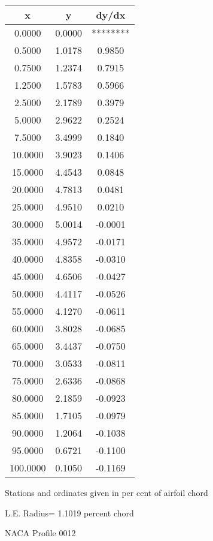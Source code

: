 \documentclass[11pt]{book}
\begin{document}
 \vspace{8mm}
 \begin{tabular}{|c|c|c|} \hline 
  x  &  y  &  dy/dx \\
 \hline
0.0000 & 0.0000 & ******** \\
0.5000 & 1.0178 & 0.9850 \\
0.7500 & 1.2374 & 0.7915 \\
1.2500 & 1.5783 & 0.5966 \\
2.5000 & 2.1789 & 0.3979 \\
5.0000 & 2.9622 & 0.2524 \\
7.5000 & 3.4999 & 0.1840 \\
10.0000 & 3.9023 & 0.1406 \\
15.0000 & 4.4543 & 0.0848 \\
20.0000 & 4.7813 & 0.0481 \\
25.0000 & 4.9510 & 0.0210 \\
30.0000 & 5.0014 & -0.0001 \\
35.0000 & 4.9572 & -0.0171 \\
40.0000 & 4.8358 & -0.0310 \\
45.0000 & 4.6506 & -0.0427 \\
50.0000 & 4.4117 & -0.0526 \\
55.0000 & 4.1270 & -0.0611 \\
60.0000 & 3.8028 & -0.0685 \\
65.0000 & 3.4437 & -0.0750 \\
70.0000 & 3.0533 & -0.0811 \\
75.0000 & 2.6336 & -0.0868 \\
80.0000 & 2.1859 & -0.0923 \\
85.0000 & 1.7105 & -0.0979 \\
90.0000 & 1.2064 & -0.1038 \\
95.0000 & 0.6721 & -0.1100 \\
100.0000 & 0.1050 & -0.1169 \\
 \hline
 \end{tabular}
 \vspace{8mm}


Stations and ordinates given in per cent of airfoil chord 


L.E. Radius=  1.1019 percent chord
 \newpage
  \label{p0012}
 \begin{Large}
 NACA Profile 0012
 \end{Large}
  
\end{document}

